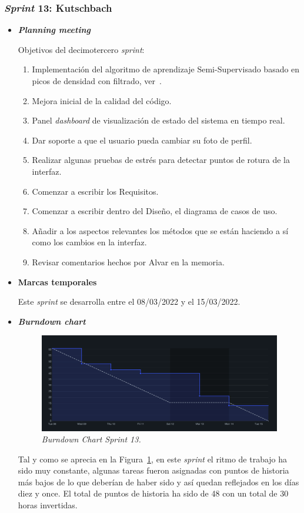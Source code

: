 \subsubsection{\textit{Sprint} 13: Kutschbach}
\begin{itemize}
\item \textbf{\textit{Planning meeting}}

Objetivos del decimotercero \textit{sprint}:
\begin{enumerate}
\item Implementación del algoritmo de aprendizaje Semi-Supervisado basado en picos de densidad con filtrado, ver~\cite{LI2019104895}.
\item Mejora inicial de la calidad del código.
\item Panel \textit{dashboard} de visualización de estado del sistema en tiempo real.
\item Dar soporte a que el usuario pueda cambiar su foto de perfil.
\item Realizar algunas pruebas de estrés para detectar puntos de rotura de la interfaz.
\item Comenzar a escribir los Requisitos.
\item Comenzar a escribir dentro del Diseño, el diagrama de casos de uso.
\item Añadir a los aspectos relevantes los métodos que se están haciendo a sí como los cambios en la interfaz.
\item Revisar comentarios hechos por Alvar en la memoria.
\end{enumerate}
\item \textbf{Marcas temporales}

Este \textit{sprint} se desarrolla entre el 08/03/2022 y el 15/03/2022.
\item \textbf{\textit{Burndown chart}}

\begin{figure}
\begin{center}
\includegraphics[width=\textwidth]{../img/anexos/sprints/BD-Sprint13}
\caption{\textit{Burndown Chart Sprint 13.}}\label{fig:BD-Sprint13}
\end{center}
\end{figure}
Tal y como se aprecia en la Figura~\ref{fig:BD-Sprint13}, en este \textit{sprint} el ritmo de trabajo ha sido muy constante, algunas tareas fueron asignadas con puntos de historia más bajos de lo que deberían de haber sido y así quedan reflejados en los días diez y once. El total de puntos de historia ha sido de 48 con un total de 30 horas invertidas.


\end{itemize}
